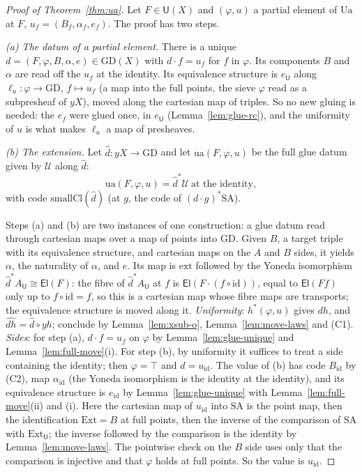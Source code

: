 \documentclass[11pt]{article}
\newcommand{\U}{\mathsf{U}}
\newcommand{\El}{\mathsf{El}}
\newcommand{\Ext}{\mathrm{Ext}}
\newcommand{\ext}{\mathrm{ext}}
\newcommand{\GD}{\mathrm{GD}}
\newcommand{\SA}{\mathrm{SA}}
\newcommand{\Ua}{\mathrm{Ua}}
\newcommand{\ua}{\mathrm{ua}}
\newcommand{\id}{\mathrm{id}}
\theoremstyle{plain}
\theoremstyle{definition}
\theoremstyle{remark}
\begin{document}
\begin{proof}[Proof of Theorem~\ref{thm:ua}]
Let $F\in\U(X)$ and $(\varphi,u)$ a partial element of $\Ua$ at $F$,
$u_f=(B_f,\alpha_f,e_f)$. The proof has two steps.

\emph{(a) The datum of a partial element.} There is a unique
$d=(F,\varphi,B,\alpha,e)\in\GD(X)$ with $d\cdot f=u_f$ for $f$ in
$\varphi$. Its components $B$ and $\alpha$ are read off the $u_f$ at the
identity. Its equivalence structure is $e_\U$ along
$\ell_u:\varphi\to\GD$, $f\mapsto u_f$ (a map into the full points, the
sieve $\varphi$ read as a subpresheaf of $yX$), moved along the
cartesian map of triples. So no new gluing is needed: the $e_f$ were
glued once, in $e_\U$ (Lemma~\ref{lem:glue-rc}), and the uniformity of
$u$ is what makes $\ell_u$ a map of presheaves.

\emph{(b) The extension.} Let $\hat d:yX\to\GD$ and let
$\ua(F,\varphi,u)$ be the full glue datum given by $\mathcal U$ along
$\hat d$:
\[
\ua(F,\varphi,u)=\hat d^*\mathcal U\ \text{at the identity},
\]
with code $\mathrm{smallCl}(\hat d)$ (at $g$, the code of
$(d\cdot g)^*\SA$).

Steps (a) and (b) are two instances of one construction: a glue datum
read through cartesian maps over a map of points into $\GD$. Given $B$,
a target triple with its equivalence structure, and cartesian maps on
the $A$ and $B$ sides, it yields $\alpha$, the naturality of $\alpha$,
and $e$. Its map is $\ext$ followed by the
Yoneda isomorphism $\hat d^*A_\U\cong\El(F)$: the fibre of $\hat d^*A_\U$
at $f$ is $\El(F\cdot(f\circ\mathrm{id}))$, equal to $\El(Ff)$ only
up to $f\circ\mathrm{id}=f$, so this is a cartesian map whose fibre maps
are transports; the equivalence structure is moved along it.
\emph{Uniformity}: $h^*(\varphi,u)$ gives $dh$, and
$\widehat{dh}=\hat d\circ yh$; conclude by Lemma~\ref{lem:xsub-o},
Lemma~\ref{lem:move-laws} and (C1).
\emph{Sides}: for step (a), $d\cdot f=u_f$ on $\varphi$ by
Lemma~\ref{lem:glue-unique} and Lemma~\ref{lem:full-move}(i). For step
(b), by uniformity it suffices to treat a side containing the identity;
then $\varphi=\top$ and $d=u_\id$. The value of (b) has code $B_\id$ by
(C2), map $\alpha_\id$ (the Yoneda isomorphism is the identity at the
identity), and its equivalence structure is $e_\id$ by
Lemma~\ref{lem:glue-unique} with Lemma~\ref{lem:full-move}(ii) and (i).
Here the cartesian map of $u_\id$ into $\SA$ is the point map, then the
identification $\Ext=B$ at full points, then the inverse of the
comparison of $\SA$ with $\Ext_\U$; the inverse followed by the
comparison is the identity by Lemma~\ref{lem:move-laws}. The pointwise
check on the $B$ side uses only that the comparison is injective and
that $\varphi$ holds at full points. So the value is $u_\id$.
\end{proof}
\end{document}
